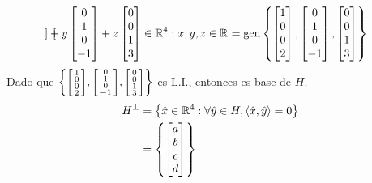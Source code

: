 \begin{solution}
\begin{align*}
{\begin{bmatrix}
		\end{bmatrix}
		+ y
		\begin{bmatrix}
			0 \\ 1 \\ 0 \\ - 1
		\end{bmatrix}
		+ z
		\begin{bmatrix}
			0 \\ 0 \\ 1 \\ 3
		\end{bmatrix}
		\in\rmath[4]: x, y, z\in\rmath
		} =\mgen[1]{\set{
		\begin{bmatrix}
			1 \\ 0 \\ 0 \\ 2
		\end{bmatrix},
		\begin{bmatrix}
			0 \\ 1 \\ 0 \\ - 1
		\end{bmatrix},
		\begin{bmatrix}
			0 \\ 0 \\ 1 \\ 3
		\end{bmatrix}
		}}
	\end{align*}
	Dado que $\left\{ 
	\begin{bsmallmatrix}
		1 \\ 0 \\ 0 \\ 2
	\end{bsmallmatrix},
	\begin{bsmallmatrix}
		0 \\ 1 \\ 0 \\ - 1
	\end{bsmallmatrix},
	\begin{bsmallmatrix}
		0 \\ 0 \\ 1 \\ 3
	\end{bsmallmatrix}
	 \right\}$ es L.I., entonces es base de $H$.
	\begin{align*}
		\mperp{H} &=\set{\hat{x}\in\rmath[4]:\forall\hat{y}\in H,\inprod{\hat{x},\hat{y}} = 0}\\
		&=\set{
		\begin{bmatrix}
			a \\ b \\ c \\ d

\end{bmatrix}}
\end{align*}
\end{solution}
